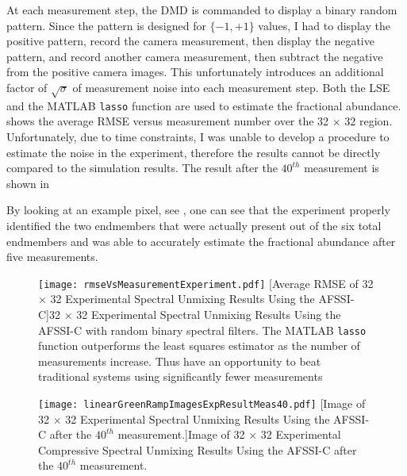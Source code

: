 At each measurement step, the DMD is commanded to display a binary random pattern. Since the pattern is designed for $\{ -1, +1 \}$ values, I had to display the positive pattern, record the camera measurement, then display the negative pattern, and record another camera measurement, then subtract the negative from the positive camera images. This unfortunately introduces an additional factor of $\sqrt{\sigma}$ of measurement noise into each measurement step. Both the LSE and the MATLAB \texttt{lasso} function are used to estimate the fractional abundance.  shows the average RMSE versus measurement number over the 32 $\times$ 32 region. Unfortunately, due to time constraints, I was unable to develop a procedure to estimate the noise in the experiment, therefore the results cannot be directly compared to the simulation results. The result after the $40^{th}$ measurement is shown in  

 By looking at an example pixel, see , one can see that the experiment properly identified the two endmembers that were actually present out of the six total endmembers and was able to accurately estimate the fractional abundance after five measurements. 


\begin{figure}[H]
	\centering
	\texttt{[image: rmseVsMeasurementExperiment.pdf]}
	[Average RMSE of 32 $\times$ 32 Experimental Spectral Unmixing Results Using the AFSSI-C]{32 $\times$ 32 Experimental Spectral Unmixing Results Using the AFSSI-C with random binary spectral filters. The MATLAB \texttt{lasso} function outperforms the least squares estimator as the number of measurements increase. Thus have an opportunity to beat traditional systems using significantly fewer measurements}
	\label{fig:rmseVsMeasurementExperiment} 
\end{figure}

\begin{figure}[H]
	\centering
	\texttt{[image: linearGreenRampImagesExpResultMeas40.pdf]}
	[Image of 32 $\times$ 32 Experimental Spectral Unmixing Results Using the AFSSI-C after the $40^{th}$ measurement.]{Image of 32 $\times$ 32 Experimental Compressive Spectral Unmixing Results Using the AFSSI-C after the $40^{th}$ measurement.}
	\label{fig:linearGreenRampImagesExpResultMeas40} 
\end{figure}

